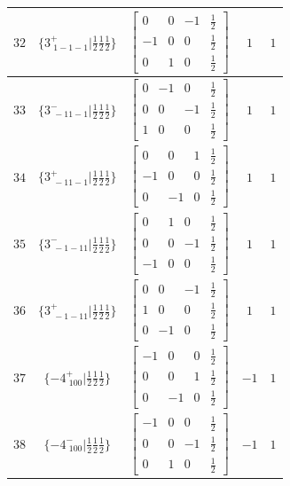 \documentclass[fleqn,8pt]{jsarticle}
\begin{document}
\begin{longtable}{ccccc}
$ 32 $ & $ \{3^{+}_{\,\,1-1-1}|\frac{1}{2} \frac{1}{2} \frac{1}{2}\} $ & $ \begin{bmatrix} 0 & 0 & -1 & \frac{1}{2} \\ -1 & 0 & 0 & \frac{1}{2} \\ 0 & 1 & 0 & \frac{1}{2} \end{bmatrix} $ & $ 1 $ & $ 1 $ \\ \hline
$ 33 $ & $ \{3^{-}_{\,\,-11-1}|\frac{1}{2} \frac{1}{2} \frac{1}{2}\} $ & $ \begin{bmatrix} 0 & -1 & 0 & \frac{1}{2} \\ 0 & 0 & -1 & \frac{1}{2} \\ 1 & 0 & 0 & \frac{1}{2} \end{bmatrix} $ & $ 1 $ & $ 1 $ \\ \hline
$ 34 $ & $ \{3^{+}_{\,\,-11-1}|\frac{1}{2} \frac{1}{2} \frac{1}{2}\} $ & $ \begin{bmatrix} 0 & 0 & 1 & \frac{1}{2} \\ -1 & 0 & 0 & \frac{1}{2} \\ 0 & -1 & 0 & \frac{1}{2} \end{bmatrix} $ & $ 1 $ & $ 1 $ \\ \hline
$ 35 $ & $ \{3^{-}_{\,\,-1-11}|\frac{1}{2} \frac{1}{2} \frac{1}{2}\} $ & $ \begin{bmatrix} 0 & 1 & 0 & \frac{1}{2} \\ 0 & 0 & -1 & \frac{1}{2} \\ -1 & 0 & 0 & \frac{1}{2} \end{bmatrix} $ & $ 1 $ & $ 1 $ \\ \hline
$ 36 $ & $ \{3^{+}_{\,\,-1-11}|\frac{1}{2} \frac{1}{2} \frac{1}{2}\} $ & $ \begin{bmatrix} 0 & 0 & -1 & \frac{1}{2} \\ 1 & 0 & 0 & \frac{1}{2} \\ 0 & -1 & 0 & \frac{1}{2} \end{bmatrix} $ & $ 1 $ & $ 1 $ \\ \hline
$ 37 $ & $ \{-4^{+}_{\,\,100}|\frac{1}{2} \frac{1}{2} \frac{1}{2}\} $ & $ \begin{bmatrix} -1 & 0 & 0 & \frac{1}{2} \\ 0 & 0 & 1 & \frac{1}{2} \\ 0 & -1 & 0 & \frac{1}{2} \end{bmatrix} $ & $ -1 $ & $ 1 $ \\ \hline
$ 38 $ & $ \{-4^{-}_{\,\,100}|\frac{1}{2} \frac{1}{2} \frac{1}{2}\} $ & $ \begin{bmatrix} -1 & 0 & 0 & \frac{1}{2} \\ 0 & 0 & -1 & \frac{1}{2} \\ 0 & 1 & 0 & \frac{1}{2} \end{bmatrix} $ & $ -1 $ & $ 1 $ \\ \hline

\end{longtable}
\end{document}
